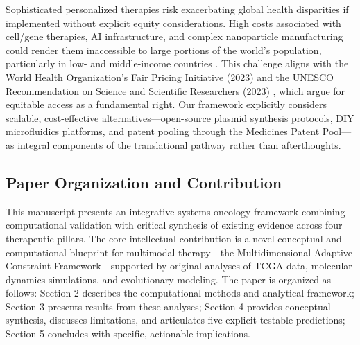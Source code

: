 \documentclass[12pt,a4paper]{article}
\begin{document}
Sophisticated personalized therapies risk exacerbating global health disparities if implemented without explicit equity considerations. High costs associated with cell/gene therapies, AI infrastructure, and complex nanoparticle manufacturing could render them inaccessible to large portions of the world's population, particularly in low- and middle-income countries \citep{farmer2018}. This challenge aligns with the World Health Organization's Fair Pricing Initiative (2023) \citep{who2023} and the UNESCO Recommendation on Science and Scientific Researchers (2023) \citep{unesco2023}, which argue for equitable access as a fundamental right. Our framework explicitly considers scalable, cost-effective alternatives—open-source plasmid synthesis protocols, DIY microfluidics platforms, and patent pooling through the Medicines Patent Pool—as integral components of the translational pathway rather than afterthoughts.

\subsection{Paper Organization and Contribution}

This manuscript presents an integrative systems oncology framework combining computational validation with critical synthesis of existing evidence across four therapeutic pillars. The core intellectual contribution is a novel conceptual and computational blueprint for multimodal therapy—the Multidimensional Adaptive Constraint Framework—supported by original analyses of TCGA data, molecular dynamics simulations, and evolutionary modeling. The paper is organized as follows: Section 2 describes the computational methods and analytical framework; Section 3 presents results from these analyses; Section 4 provides conceptual synthesis, discusses limitations, and articulates five explicit testable predictions; Section 5 concludes with specific, actionable implications.
\end{document}
